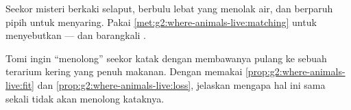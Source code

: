 \begin{exercise}[$\star\star$]\label{exo:g2:where-animals-live:9}
Seekor  misteri berkaki selaput, berbulu lebat yang menolak air,
dan berparuh pipih untuk menyaring. Pakai
\cref{met:g2:where-animals-live:matching} untuk menyebutkan
 --- dan barangkali .
\end{exercise}

\begin{exercise}[$\star\star$]\label{exo:g2:where-animals-live:10}
Tomi ingin ``menolong'' seekor katak dengan membawanya pulang ke
sebuah terarium kering yang penuh makanan. Dengan memakai
\cref{prop:g2:where-animals-live:fit} dan
\cref{prop:g2:where-animals-live:loss}, jelaskan mengapa hal ini sama
sekali tidak akan menolong kataknya.
\end{exercise}
